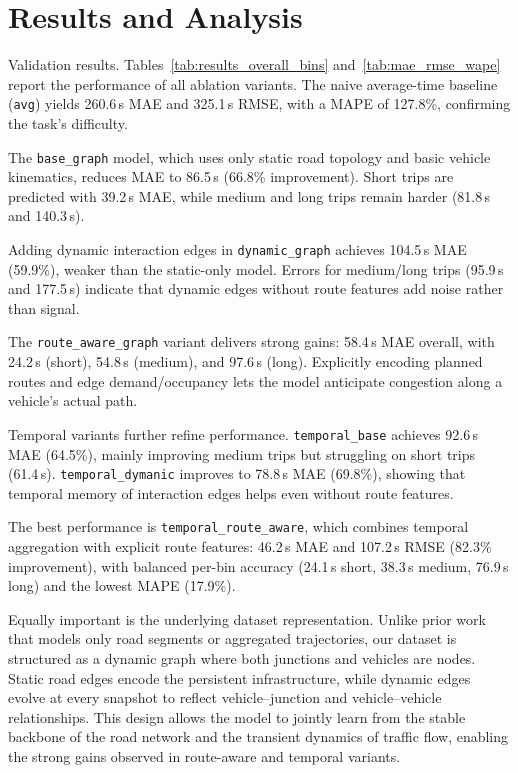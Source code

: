 \section{Results and Analysis}
\noindent Validation results. Tables~\ref{tab:results_overall_bins} and~\ref{tab:mae_rmse_wape} report the performance of all ablation variants. The naive average-time baseline (\texttt{avg}) yields 260.6\,s MAE and 325.1\,s RMSE, with a MAPE of 127.8\%, confirming the task's difficulty.

The \texttt{base\_graph} model, which uses only static road topology and basic vehicle kinematics, reduces MAE to 86.5\,s (66.8\% improvement). Short trips are predicted with 39.2\,s MAE, while medium and long trips remain harder (81.8\,s and 140.3\,s).

Adding dynamic interaction edges in \texttt{dynamic\_graph} achieves 104.5\,s MAE (59.9\%), weaker than the static-only model. Errors for medium/long trips (95.9\,s and 177.5\,s) indicate that dynamic edges without route features add noise rather than signal.

The \texttt{route\_aware\_graph} variant delivers strong gains: 58.4\,s MAE overall, with 24.2\,s (short), 54.8\,s (medium), and 97.6\,s (long). Explicitly encoding planned routes and edge demand/occupancy lets the model anticipate congestion along a vehicle's actual path.

Temporal variants further refine performance. \texttt{temporal\_base} achieves 92.6\,s MAE (64.5\%), mainly improving medium trips but struggling on short trips (61.4\,s). \texttt{temporal\_dymanic} improves to 78.8\,s MAE (69.8\%), showing that temporal memory of interaction edges helps even without route features.

The best performance is \texttt{temporal\_route\_aware}, which combines temporal aggregation with explicit route features: 46.2\,s MAE and 107.2\,s RMSE (82.3\% improvement), with balanced per-bin accuracy (24.1\,s short, 38.3\,s medium, 76.9\,s long) and the lowest MAPE (17.9\%).

Equally important is the underlying dataset representation. Unlike prior work that models only road segments or aggregated trajectories, our dataset is structured as a dynamic graph where both junctions and vehicles are nodes. Static road edges encode the persistent infrastructure, while dynamic edges evolve at every snapshot to reflect vehicle–junction and vehicle–vehicle relationships. This design allows the model to jointly learn from the stable backbone of the road network and the transient dynamics of traffic flow, enabling the strong gains observed in route-aware and temporal variants.

